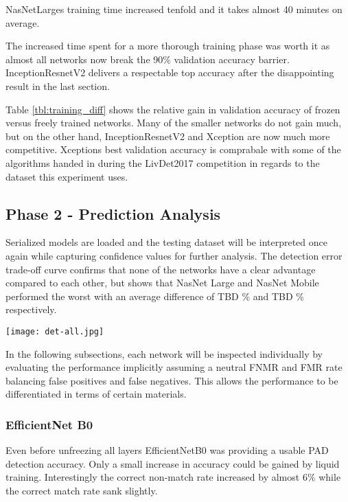 


NasNetLarges training time increased tenfold and it takes almost 40 minutes on average.





The increased time spent for a more thorough training phase was worth it as almost all networks now break the 90\% validation accuracy barrier.
InceptionResnetV2 delivers a respectable top accuracy after the disappointing result in the last section.





Table \ref{tbl:training_diff} shows the relative gain in validation accuracy of frozen versus freely trained networks.
Many of the smaller networks do not gain much, but on the other hand, InceptionResnetV2 and Xception are now much more competitive.
Xceptions best validation accuracy is comprabale with some of the algorithms handed in during the LivDet2017 competition in regards to the dataset this experiment uses. \cite{LIVDET}

\hfill

\subsection{Phase 2 - Prediction Analysis}
Serialized models are loaded and the testing dataset will be interpreted once again while capturing confidence values for further analysis.
The detection error trade-off curve confirms that none of the networks have a clear advantage compared to each other, but shows that NasNet Large and NasNet Mobile performed the worst with an average difference of TBD \% and TBD \% respectively.



\texttt{[image: det-all.jpg]}


In the following subsections, each network will be inspected individually by evaluating the performance implicitly assuming a neutral FNMR and FMR rate balancing false positives and false negatives.
This allows the performance to be differentiated in terms of certain materials.


\newpage
\subsubsection{EfficientNet B0}
Even before unfreezing all layers EfficientNetB0 was providing a usable PAD detection accuracy.
Only a small increase in accuracy could be gained by liquid training.
Interestingly the correct non-match rate increased by almost 6\% while the correct match rate sank slightly.

